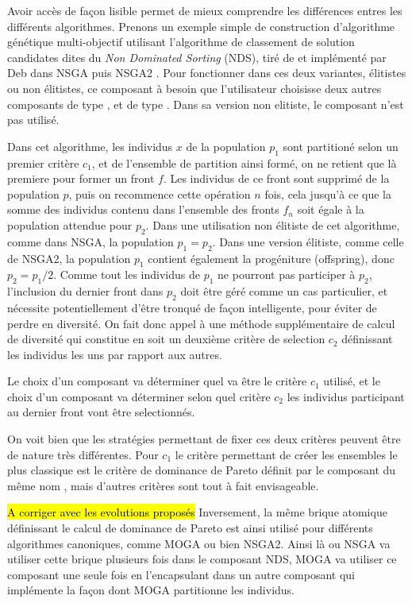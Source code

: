 Avoir accès de façon lisible permet de mieux comprendre les différences entres les différents algorithmes. Prenons un exemple simple de construction d'algorithme génétique multi-objectif utilisant l'algorithme de classement de solution candidates dites du \textit{Non Dominated Sorting} (NDS), tiré de \autocite{Goldberg1989} et implémenté par Deb dans NSGA \autocite{Deb1994} puis NSGA2 \autocite{Deb2001}. Pour fonctionner dans ces deux variantes, élitistes ou non élitistes, ce composant à besoin que l'utilisateur choisisse deux autres composants de type , et de type . Dans sa version non elitiste, le composant  n'est pas utilisé.

Dans cet algorithme, les individus $x$ de la population $p_1$ sont partitioné selon un premier critère $c_1$, et de l'ensemble de partition ainsi formé, on ne retient que là premiere pour former un front $f$. Les individus de ce front sont supprimé de la population $p$, puis on recommence cette opération $n$ fois, cela jusqu'à ce que la somme des individus contenu dans l'ensemble des fronts $f_n$ soit égale à la population attendue pour $p_2$. Dans une utilisation non élitiste de cet algorithme, comme dans NSGA, la population $p_1 = p_2$. Dans une version élitiste, comme celle de NSGA2, la population $p_1$ contient également la progéniture (offspring), donc $p_2 = p_1 / 2$. Comme tout les individus de $p_1$ ne pourront pas participer à $p_2$, l'inclusion du dernier front dans $p_2$ doit être géré comme un cas particulier, et nécessite potentiellement d'être tronqué de façon intelligente, pour éviter de perdre en diversité. On fait donc appel à une méthode supplémentaire de calcul de diversité qui constitue en soit un deuxième critère de selection $c_2$ définissant les individus les uns par rapport aux autres.

Le choix d'un composant  va déterminer quel va être le critère $c_1$ utilisé, et le choix d'un composant  va déterminer selon quel critère $c_2$ les individus participant au dernier front vont être selectionnés. 

On voit bien que les stratégies permettant de fixer ces deux critères peuvent être de nature très différentes. Pour $c_1$ le critère permettant de créer les ensembles le plus classique est le critère de dominance de Pareto définit par le composant du même nom , mais d'autres critères sont tout à fait envisageable. 

\hl{ A corriger avec les evolutions proposés}
Inversement, la même brique atomique définissant le calcul de dominance de Pareto est ainsi utilisé pour différents algorithmes canoniques, comme MOGA ou bien NSGA2. Ainsi là ou NSGA va utiliser cette brique plusieurs fois dans le composant NDS, MOGA va utiliser ce composant une seule fois en l'encapsulant dans un autre composant qui implémente la façon dont MOGA partitionne les individus.

